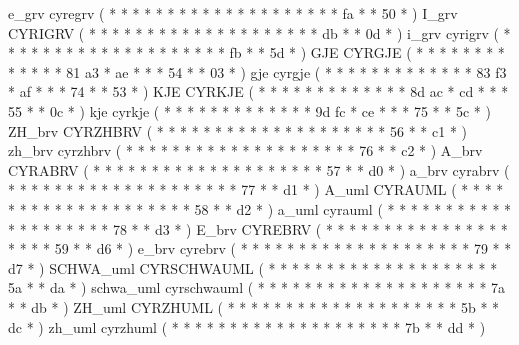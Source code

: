 \makecod e_grv        cyregrv           ( *  *       *  *   *  *  *  *     *  *  *  *  *     *  *  *  *     *  *  *     fa  *  *    50 *   )
\makeCOD I_grv        CYRIGRV           ( *  *       *  *   *  *  *  *     *  *  *  *  *     *  *  *  *     *  *  *     db  *  *    0d *   )
\makecod i_grv        cyrigrv           ( *  *       *  *   *  *  *  *     *  *  *  *  *     *  *  *  *     *  *  *     fb  *  *    5d *   )
\makeCOD GJE          CYRGJE            ( *  *       *  *   *  *  *  *     *  *  *  *  *     81 a3 *  ae    *  *  *     54  *  *    03 *   )
\makecod gje          cyrgje            ( *  *       *  *   *  *  *  *     *  *  *  *  *     83 f3 *  af    *  *  *     74  *  *    53 *   )
\makeCOD KJE          CYRKJE            ( *  *       *  *   *  *  *  *     *  *  *  *  *     8d ac *  cd    *  *  *     55  *  *    0c *   )
\makecod kje          cyrkje            ( *  *       *  *   *  *  *  *     *  *  *  *  *     9d fc *  ce    *  *  *     75  *  *    5c *   )
\makeCOD ZH_brv       CYRZHBRV          ( *  *       *  *   *  *  *  *     *  *  *  *  *     *  *  *  *     *  *  *     56  *  *    c1 *   )
\makecod zh_brv       cyrzhbrv          ( *  *       *  *   *  *  *  *     *  *  *  *  *     *  *  *  *     *  *  *     76  *  *    c2 *   )
\makeCOD A_brv        CYRABRV           ( *  *       *  *   *  *  *  *     *  *  *  *  *     *  *  *  *     *  *  *     57  *  *    d0 *   )
\makecod a_brv        cyrabrv           ( *  *       *  *   *  *  *  *     *  *  *  *  *     *  *  *  *     *  *  *     77  *  *    d1 *   )
\makeCOD A_uml        CYRAUML           ( *  *       *  *   *  *  *  *     *  *  *  *  *     *  *  *  *     *  *  *     58  *  *    d2 *   )
\makecod a_uml        cyrauml           ( *  *       *  *   *  *  *  *     *  *  *  *  *     *  *  *  *     *  *  *     78  *  *    d3 *   )
\makeCOD E_brv        CYREBRV           ( *  *       *  *   *  *  *  *     *  *  *  *  *     *  *  *  *     *  *  *     59  *  *    d6 *   )
\makecod e_brv        cyrebrv           ( *  *       *  *   *  *  *  *     *  *  *  *  *     *  *  *  *     *  *  *     79  *  *    d7 *   )
\makeCOD SCHWA_uml    CYRSCHWAUML       ( *  *       *  *   *  *  *  *     *  *  *  *  *     *  *  *  *     *  *  *     5a  *  *    da *   )
\makecod schwa_uml    cyrschwauml       ( *  *       *  *   *  *  *  *     *  *  *  *  *     *  *  *  *     *  *  *     7a  *  *    db *   )
\makeCOD ZH_uml       CYRZHUML          ( *  *       *  *   *  *  *  *     *  *  *  *  *     *  *  *  *     *  *  *     5b  *  *    dc *   )
\makecod zh_uml       cyrzhuml          ( *  *       *  *   *  *  *  *     *  *  *  *  *     *  *  *  *     *  *  *     7b  *  *    dd *   )
